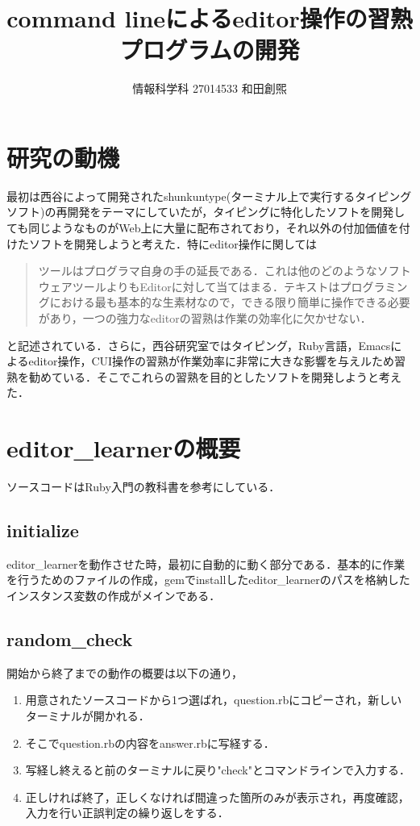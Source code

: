 \documentclass[a4j,twocolumn]{jsarticle}
\def\tightlist{\itemsep1pt\parskip0pt\parsep0pt}
\begin{document}
\title{command lineによるeditor操作の習熟プログラムの開発}
\author{情報科学科 \hspace{5mm} 27014533 \hspace{5mm} 和田創煕}
\date{}
\maketitle


\section{研究の動機}
最初は西谷によって開発されたshunkuntype(ターミナル上で実行するタイピングソフト)の再開発をテーマにしていたが，タイピングに特化したソフトを開発しても同じようなものがWeb上に大量に配布されており，それ以外の付加価値を付けたソフトを開発しようと考えた．特にeditor操作に関しては
\begin{quotation}
ツールはプログラマ自身の手の延長である．これは他のどのようなソフトウェアツールよりもEditorに対して当てはまる．テキストはプログラミングにおける最も基本的な生素材なので，できる限り簡単に操作できる必要があり，一つの強力なeditorの習熟は作業の効率化に欠かせない\cite{達人プログラマー}． 
\end{quotation}
と記述されている．さらに，西谷研究室ではタイピング，Ruby言語，Emacsによるeditor操作，CUI操作の習熟が作業効率に非常に大きな影響を与えルため習熟を勧めている．そこでこれらの習熟を目的としたソフトを開発しようと考えた．


\section{editor\_learnerの概要}
ソースコードはRuby入門の教科書を参考にしている\cite{ruby}．
\subsection{initialize}
editor\_learnerを動作させた時，最初に自動的に動く部分である．基本的に作業を行うためのファイルの作成，gemでinstallしたeditor\_learnerのパスを格納したインスタンス変数の作成がメインである．
\subsection{random\_check}
開始から終了までの動作の概要は以下の通り，
\begin{enumerate}
\def\labelenumi{\arabic{enumi}.}
\tightlist
\item
用意されたソースコードから1つ選ばれ，question.rbにコピーされ，新しいターミナルが開かれる．
\item
そこでquestion.rbの内容をanswer.rbに写経する．
\item
写経し終えると前のターミナルに戻り"check"とコマンドラインで入力する．
\item
正しければ終了，正しくなければ間違った箇所のみが表示され，再度確認，入力を行い正誤判定の繰り返しをする．
\end{enumerate}
\end{document}
